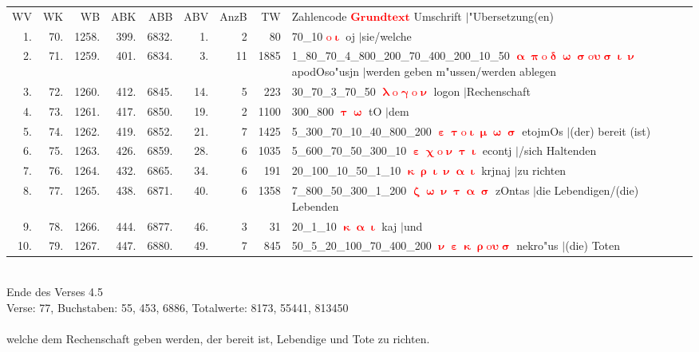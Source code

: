 \documentclass[a4paper,10pt,landscape]{article}
\begin{document}
\begin{tabular}{rrrrrrrrp{120mm}}
WV&WK&WB&ABK&ABB&ABV&AnzB&TW&Zahlencode \textcolor{red}{$\boldsymbol{Grundtext}$} Umschrift $|$"Ubersetzung(en)\\
1.&70.&1258.&399.&6832.&1.&2&80&70\_10 \textcolor{red}{$\boldsymbol{\mathrm{o}\upiota}$} oj $|$sie/welche\\
2.&71.&1259.&401.&6834.&3.&11&1885&1\_80\_70\_4\_800\_200\_70\_400\_200\_10\_50 \textcolor{red}{$\boldsymbol{\upalpha\uppi\mathrm{o}\updelta\upomega\upsigma\mathrm{o}\upsilon\upsigma\upiota\upnu}$} apodOso"usjn $|$werden geben m"ussen/werden ablegen\\
3.&72.&1260.&412.&6845.&14.&5&223&30\_70\_3\_70\_50 \textcolor{red}{$\boldsymbol{\uplambda\mathrm{o}\upgamma\mathrm{o}\upnu}$} logon $|$Rechenschaft\\
4.&73.&1261.&417.&6850.&19.&2&1100&300\_800 \textcolor{red}{$\boldsymbol{\uptau\upomega}$} tO $|$dem\\
5.&74.&1262.&419.&6852.&21.&7&1425&5\_300\_70\_10\_40\_800\_200 \textcolor{red}{$\boldsymbol{\upepsilon\uptau\mathrm{o}\upiota\upmu\upomega\upsigma}$} etojmOs $|$(der) bereit (ist)\\
6.&75.&1263.&426.&6859.&28.&6&1035&5\_600\_70\_50\_300\_10 \textcolor{red}{$\boldsymbol{\upepsilon\upchi\mathrm{o}\upnu\uptau\upiota}$} econtj $|$/sich Haltenden\\
7.&76.&1264.&432.&6865.&34.&6&191&20\_100\_10\_50\_1\_10 \textcolor{red}{$\boldsymbol{\upkappa\uprho\upiota\upnu\upalpha\upiota}$} krjnaj $|$zu richten\\
8.&77.&1265.&438.&6871.&40.&6&1358&7\_800\_50\_300\_1\_200 \textcolor{red}{$\boldsymbol{\upzeta\upomega\upnu\uptau\upalpha\upsigma}$} zOntas $|$die Lebendigen/(die) Lebenden\\
9.&78.&1266.&444.&6877.&46.&3&31&20\_1\_10 \textcolor{red}{$\boldsymbol{\upkappa\upalpha\upiota}$} kaj $|$und\\
10.&79.&1267.&447.&6880.&49.&7&845&50\_5\_20\_100\_70\_400\_200 \textcolor{red}{$\boldsymbol{\upnu\upepsilon\upkappa\uprho\mathrm{o}\upsilon\upsigma}$} nekro"us $|$(die) Toten\\
\end{tabular}\medskip \\
Ende des Verses 4.5\\
Verse: 77, Buchstaben: 55, 453, 6886, Totalwerte: 8173, 55441, 813450\\
\\
welche dem Rechenschaft geben werden, der bereit ist, Lebendige und Tote zu richten.\\
\end{document}
